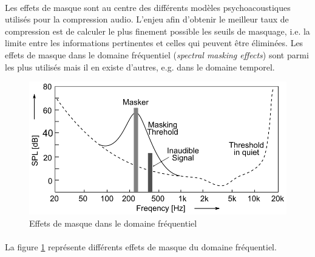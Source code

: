 \documentclass{article}
\begin{document}
    \paragraph{}
    Les effets de masque sont au centre des différents modèles psychoacoustiques utilisés pour la compression audio. L'enjeu afin d'obtenir le meilleur taux de compression est de calculer le plus finement possible les seuils de masquage, i.e. la limite entre les informations pertinentes et celles qui peuvent être éliminées. Les effets de masque dans le domaine fréquentiel (\emph{spectral masking effects}) sont parmi les plus utilisés mais il en existe d'autres, e.g. dans le domaine temporel.
    \begin{figure}[H]
        \centering
        \includegraphics[width=.6\linewidth]{./images/2019-Herre-Dick-masking-effect.png}
        \caption{Effets de masque dans le domaine fréquentiel}
        \label{fig:freq_masking}
    \end{figure}

    \paragraph{}
    La figure \ref{fig:freq_masking} représente différents effets de masque du domaine fréquentiel.

\end{document}
